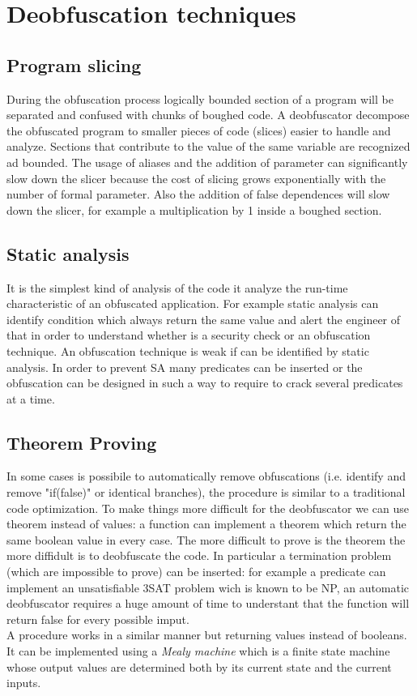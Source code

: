 \section{Deobfuscation techniques}

\subsection{Program slicing}
During the obfuscation process logically bounded section of a program will be separated and confused with chunks of boughed code. A deobfuscator decompose the obfuscated program to smaller pieces of code (slices) easier to handle and analyze. Sections that contribute to the value of the same variable are recognized ad bounded. The usage of aliases and the addition of parameter can significantly slow down the slicer because the cost of slicing grows exponentially with the number of formal parameter. Also the addition of false dependences will slow down the slicer, for example a multiplication by 1 inside a boughed section.

\subsection{Static analysis}
It is the simplest kind of analysis of the code it analyze the run-time characteristic of an obfuscated application. For example static analysis can identify condition which always return the same value and alert the engineer of that in order to understand whether is a security check or an obfuscation technique. An obfuscation technique is weak if can be identified by static analysis. In order to prevent SA many predicates can be inserted or the obfuscation can be designed in such a way to require to crack several predicates at a time.

\subsection{Theorem Proving}
In some cases is possibile to automatically remove obfuscations (i.e. identify and remove "if(false)" or identical branches), the procedure is similar to a traditional code optimization. To make things more difficult for the deobfuscator we can use theorem instead of values: a function can implement a theorem which return the same boolean value in every case. The more difficult to prove is the theorem the more diffidult is to deobfuscate the code. In particular a termination problem (which are impossible to prove) can be inserted: for example a predicate can implement an unsatisfiable 3SAT problem wich is known to be NP, an automatic deobfuscator requires a huge amount of time to understant that the function will return false for every possible imput.\\
A procedure works in a similar manner but returning values instead of booleans. It can be implemented using a \textit{Mealy machine} which is a finite state machine whose output values are determined both by its current state and the current inputs.

